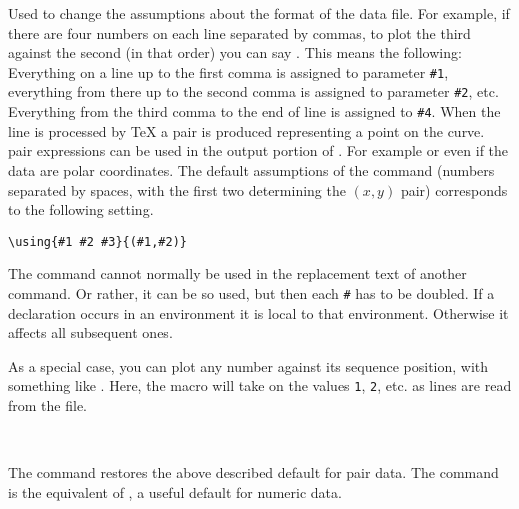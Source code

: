 \documentclass[letterpaper]{article}
\begin{document}
Used to change the assumptions about the format of the data file. For
example, if there are four numbers on each line separated by commas, to
plot the third against the second (in that order) you can say
. This means the
following: Everything on a line up to the first comma is assigned to
parameter \texttt{\#1}, everything from there up to the second comma is
assigned to parameter \texttt{\#2}, etc. Everything from the third comma
to the end of line is assigned to \texttt{\#4}. When the line is
processed by \TeX{} a \MF{} pair is produced representing a point on the
curve. \CMF{} pair expressions can be used in the output portion of
. For example 
or even  if the data
are polar coordinates. The default assumptions of the 
command (numbers separated by spaces, with the first two determining the
$(x,y)$ pair) corresponds to the following setting.
\begin{verbatim}
\using{#1 #2 #3}{(#1,#2)}
\end{verbatim}
The  command cannot normally be used in the replacement text
of another command. Or rather, it can be so used, but then each
\texttt{\#} has to be doubled. If a  declaration occurs in an
 environment it is local to that environment. Otherwise it
affects all subsequent ones.

\begin{cd}
%
\end{cd}

As a special case, you can plot any number against its sequence
position, with something like
. Here, the macro
 will take on the values \texttt{1}, \texttt{2}, etc. as
lines are read from the file.

\begin{cd}
\\
%
%
\end{cd}

The command  restores the above described default
for pair data. The command  is the equivalent of
, a useful default for numeric data.
\end{document}
